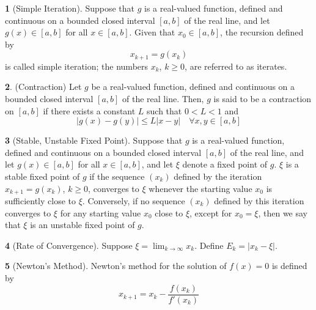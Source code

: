 \documentclass[12pt]{article}
\theoremstyle{definition}
\newtheorem{definition}{\color{NavyBlue}{\textbf{Definition}}}
\begin{document}
\begin{definition}[Simple Iteration]
Suppose that $g$ is a real-valued function, defined and continuous on a bounded closed interval $[a,b]$ of the real line, and let $g(x) \in [a,b]$ for all $x \in [a,b]$. Given that $x_0 \in [a,b]$, the recursion defined by
\begin{equation}
x_{k+1} = g(x_k)
\end{equation}
is called simple iteration; the numbers $x_k$, $k \geq 0$, are referred to as iterates.
\end{definition}

\begin{definition}(Contraction)
Let $g$ be a real-valued function, defined and continuous on a bounded closed interval $[a,b]$ of the real line. Then, $g$ is said to be a contraction on $[a,b]$ if there exists a constant $L$ such that $0<L<1$ and
\begin{equation}
|g(x)-g(y)| \leq L|x-y| \quad \forall x,y \in [a,b]
\end{equation}
\end{definition}

\begin{definition}[Stable, Unstable Fixed Point]
Suppose that $g$ is a real-valued function, defined and continuous on a bounded closed interval $[a,b]$ of the real line, and let $g(x) \in [a,b]$ for all $x \in [a,b]$, and let $\xi$ denote a fixed point of $g$. $\xi$ is a stable fixed point of $g$ if the sequence $(x_k)$ defined by the iteration $x_{k+1} = g(x_k)$, $k\geq 0$, converges to $\xi$ whenever the starting value $x_0$ is sufficiently close to $\xi$. Conversely, if no sequence $(x_k)$ defined by this iteration converges to $\xi$ for any starting value $x_0$ close to $\xi$, except for $x_0 = \xi$, then we say that $\xi$ is an unstable fixed point of $g$.
\end{definition}

\begin{definition}[Rate of Convergence]
Suppose $\xi = \lim_{k \to \infty} x_k$. Define $E_k = |x_k - \xi|$.
\end{definition}

\begin{definition}[Newton's Method]
Newton's method for the solution of $f(x) = 0$ is defined by
\begin{equation}
x_{k+1} = x_k - \frac{f(x_k)}{f'(x_k)}
\end{equation}
\end{definition}
\end{document}
